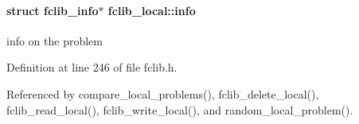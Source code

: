 \paragraph[{info}]{\setlength{\rightskip}{0pt plus 5cm}struct {\bf fclib\+\_\+info}$\ast$ fclib\+\_\+local\+::info}\label{structfclib__local_ababce9da71cdb99e4928a596dde8bc89}


info on the problem 



Definition at line 246 of file fclib.\+h.



Referenced by compare\+\_\+local\+\_\+problems(), fclib\+\_\+delete\+\_\+local(), fclib\+\_\+read\+\_\+local(), fclib\+\_\+write\+\_\+local(), and random\+\_\+local\+\_\+problem().

